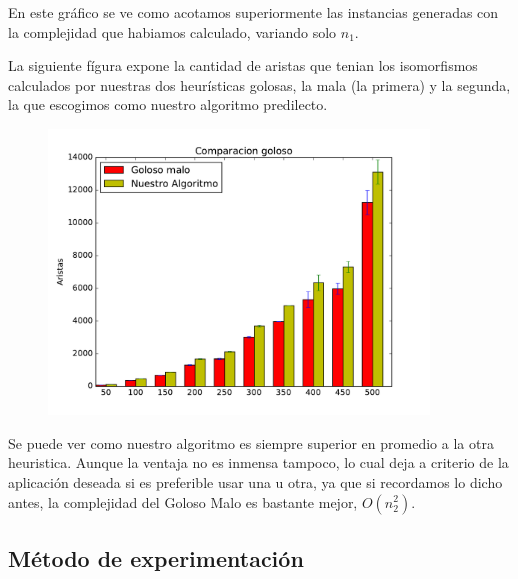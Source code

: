 En este gráfico se ve como acotamos superiormente las instancias generadas con la complejidad que habiamos calculado, variando solo $n_1$.

La siguiente fígura expone la cantidad de aristas que tenian los isomorfismos calculados por nuestras dos heurísticas golosas, la mala (la primera) y la segunda, la que escogimos como nuestro algoritmo predilecto.

\begin{figure}[H]
 \centering
	\includegraphics[width=0.9\textwidth]{graficos/problema_4/calidad.pdf}
	\caption{}
	\label{fig:problema4-4}
\end{figure}

Se puede ver como nuestro algoritmo es siempre superior en promedio a la otra heuristica. Aunque la ventaja no es  inmensa tampoco, lo cual deja a criterio de la aplicación deseada si es preferible usar una u otra, ya que si recordamos lo dicho antes, la complejidad del Goloso Malo es bastante mejor, $O(n_2^2)$.

\subsection{Método de experimentación}
